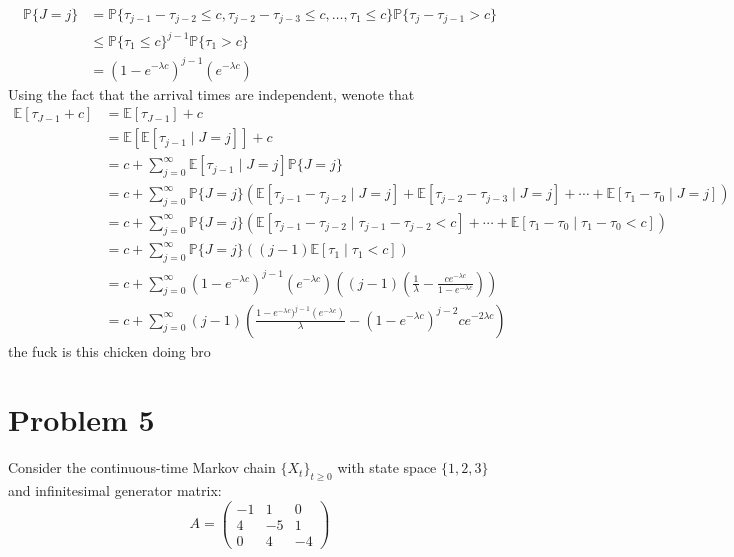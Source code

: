 \documentclass[11pt]{article}
\newcommand{\bbE}{\mathbb{E}}
\newcommand{\bbP}{\mathbb{P}}
\begin{document}
\begin{problem}
\begin{enumerate}
\begin{solution}
\begin{align*}
\bbP\{J = j\} &= \bbP\{\tau_{j-1} - \tau_{j-2} \leq  c, \tau_{j-2} - \tau_{j-3} \leq c, \dots, \tau_{1}\leq  c\} \bbP\{\tau_{j} - \tau_{j-1} >c\}\\
&\leq \bbP\{\tau_{1} \leq c\}^{j-1} \bbP\{\tau_{1} >c\}\\
&= (1-e^{-\lambda c})^{j-1}(e^{-\lambda c})
\end{align*}
Using the fact that the arrival times are independent, wenote that
    \begin{align*}
        \bbE[\tau_{J-1} + c] &= \bbE[\tau_{J-1}] + c\\
        &= \bbE[\bbE[\tau_{j-1} \mid J = j]]+ c\\
        &= c + \sum_{j=0}^\infty \bbE[\tau_{j-1} \mid J = j] \bbP\{J = j\}\\
        &= c + \sum_{j=0}^\infty \bbP\{J = j\}\left( \bbE[\tau_{j-1} - \tau_{j-2} \mid J = j] + \bbE[\tau_{j-2} - \tau_{j-3} \mid J = j] + \cdots + \bbE[\tau_{1} - \tau_{0} \mid J = j]\right)\\
        &= c + \sum_{j=0}^\infty \bbP\{J = j\}\left( \bbE[\tau_{j-1} - \tau_{j-2} \mid \tau_{j-1} - \tau_{j-2} <c] + \cdots + \bbE[\tau_{1} - \tau_{0} \mid \tau_{1} - \tau_{0} <c]\right)\\
        &= c +  \sum_{j=0}^\infty \bbP\{J = j\}\left( (j-1)\bbE[\tau_{1}\mid \tau_{1}<c]\right)\\
        &= c + \sum_{j=0}^\infty (1-e^{-\lambda c})^{j-1}(e^{-\lambda c}) \left((j-1)\left(\frac{1}{\lambda} - \frac{ce^{-\lambda c}}{1- e^{-\lambda c}}\right)\right)\\
        &= c + \sum_{j=0}^\infty (j-1)\left(\frac{1-e^{-\lambda c})^{j-1}(e^{-\lambda c})}{\lambda}- (1 - e^{-\lambda c})^{j-2}ce^{-2\lambda c}\right)
    \end{align*}
    the fuck is this chicken doing bro
\end{solution}
\end{enumerate}

\end{problem}





\newpage
\section*{Problem 5}
Consider the continuous-time Markov chain \(\{X_t\}_{t \geq 0}\) with state space \(\{1, 2, 3\}\) and infinitesimal generator matrix:
\[
A = \begin{pmatrix}
-1 & 1 & 0 \\
4 & -5 & 1 \\
0 & 4 & -4
\end{pmatrix}
\]
\end{document}
